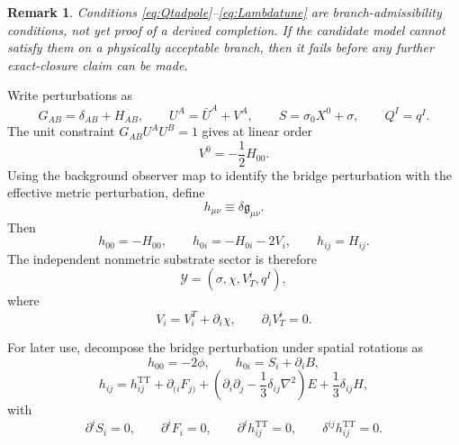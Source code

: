 \documentclass[11pt]{article}
\newcommand{\BridgeMetric}{\mathfrak{g}}
\newcommand{\Extra}{\mathcal{Y}}
\newtheorem{remark}{Remark}
\begin{document}
\begin{remark}
Conditions \eqref{eq:Qtadpole}--\eqref{eq:Lambdatune} are branch-admissibility conditions, not yet proof of a derived completion. If the candidate model cannot satisfy them on a physically acceptable branch, then it fails before any further exact-closure claim can be made.
\end{remark}

Write perturbations as
\begin{equation}
G_{AB}=\delta_{AB}+H_{AB},
\qquad
U^A=\bar U^A+V^A,
\qquad
S=\sigma_0X^0+\sigma,
\qquad
Q^I=q^I.
\label{eq:perturbations}
\end{equation}
The unit constraint \(G_{AB}U^AU^B=1\) gives at linear order
\begin{equation}
V^0=-\frac{1}{2}H_{00}.
\label{eq:V0}
\end{equation}
Using the background observer map to identify the bridge perturbation with the effective metric perturbation, define
\begin{equation}
h_{\mu\nu}\equiv \delta \BridgeMetric_{\mu\nu}.
\label{eq:hmunu}
\end{equation}
Then
\begin{equation}
h_{00}=-H_{00},
\qquad
h_{0i}=-H_{0i}-2V_i,
\qquad
h_{ij}=H_{ij}.
\label{eq:bridgepert}
\end{equation}
The independent nonmetric substrate sector is therefore
\begin{equation}
\Extra=(\sigma,\chi,V_T^i,q^I),
\label{eq:extrasector}
\end{equation}
where
\begin{equation}
V_i=V_i^T+\partial_i\chi,
\qquad
\partial_iV_T^i=0.
\label{eq:Vdecomp}
\end{equation}

For later use, decompose the bridge perturbation under spatial rotations as
\begin{equation}
h_{00}=-2\phi,
\qquad
h_{0i}=S_i+\partial_iB,
\label{eq:metricdecomp1}
\end{equation}
\begin{equation}
h_{ij}
=
h_{ij}^{\mathrm{TT}}
+\partial_{(i}F_{j)}
+\left(\partial_i\partial_j-\frac{1}{3}\delta_{ij}\nabla^2\right)E
+\frac{1}{3}\delta_{ij}H,
\label{eq:metricdecomp2}
\end{equation}
with
\begin{equation}
\partial^iS_i=0,
\qquad
\partial^iF_i=0,
\qquad
\partial^ih_{ij}^{\mathrm{TT}}=0,
\qquad
\delta^{ij}h_{ij}^{\mathrm{TT}}=0.
\label{eq:TTconds}
\end{equation}
\end{document}
